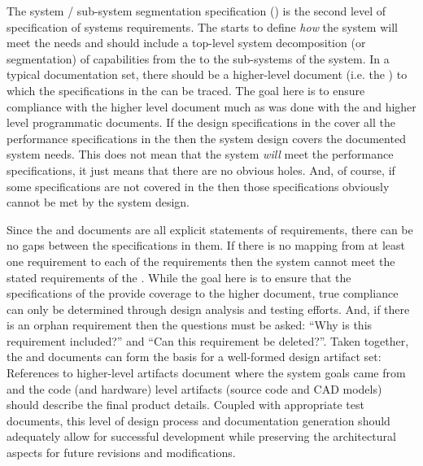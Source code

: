 The system / sub-system segmentation specification (\SSS) is the second level of specification of systems requirements.
The \SSS starts to define {\em how} the system will meet the needs and should include a top-level system decomposition (or segmentation) of capabilities from the \SPS to the sub-systems of the system.
In a typical documentation set, there should be a higher-level document (i.e. the \SPS) to which the specifications in the \SSS can be traced.
The goal here is to ensure compliance with the higher level document much as was done with the \SPS and higher level programmatic documents.
If the design specifications in the \SSS cover all the performance specifications in the \SPS then the system design covers the documented system needs.
This does not mean that the system {\em will} meet the performance specifications, it just means that there are no obvious holes.
And, of course, if some \SPS specifications are not covered in the \SSS then those specifications obviously cannot be met by the system design.


Since the \SPS and \SSS documents are all explicit statements of requirements, there can be no gaps between the specifications in them.
If there is no mapping from at least one \SSS requirement to each of the \SPS requirements then the system cannot meet the stated requirements of the \SPS.
While the goal here is to ensure that the specifications of the \SSS provide coverage to the higher document, true compliance can only be determined through design analysis and testing efforts.
And, if there is an orphan \SSS requirement then the questions must be asked: ``Why is this requirement included?'' and ``Can this requirement be deleted?''.
Taken together, the \SPS and \SSS documents can form the basis for a well-formed design artifact set: 
References to higher-level artifacts document where the system goals came from and the code (and hardware) level artifacts (source code and CAD models) should describe the final product details. 
Coupled with appropriate test documents, this level of design process and documentation generation should adequately allow for successful development while preserving the architectural aspects for future revisions and modifications.